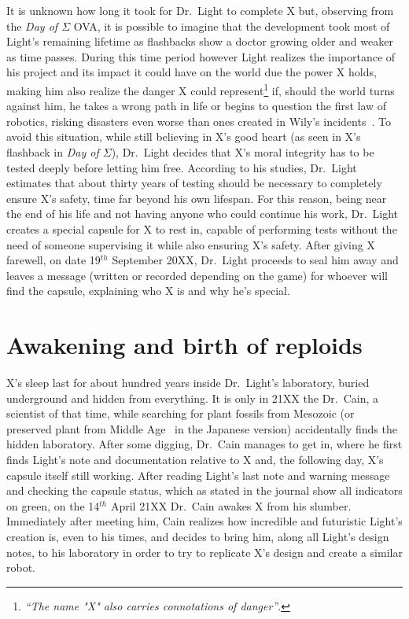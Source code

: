It is unknown how long it took for Dr.~Light to complete X but, observing from the \emph{Day of $\Sigma$} OVA, it is possible to imagine that the development took most of Light's remaining lifetime as flashbacks show a doctor growing older and weaker as time passes.  During this time period however Light realizes the importance of his project and its impact it could have on the world due the power X holds, making him also realize the danger X could represent\footnote{\textit{``The name "X" also carries connotations of danger''}.} if, should the world turns against him, he takes a wrong path in life or begins to question the first law of robotics, risking disasters even worse than ones created in Wily's incidents~\cite{elysium_light_warning}. To avoid this situation, while still believing in X's good heart (as seen in X's flashback in \emph{Day of $\Sigma$}), Dr.~Light decides that X's moral integrity has to be tested deeply before letting him free. According to his studies, Dr.~Light estimates that about thirty years of testing should be necessary to completely ensure X's safety, time far beyond his own lifespan. For this reason, being near the end of his life and not having anyone who could continue his work, Dr.~Light creates a special capsule for X to rest in, capable of performing tests without the need of someone supervising it while also ensuring X's safety. After giving X farewell, on date 19$^{th}$ September 20XX, Dr.~Light proceeds to seal him away and leaves a message (written or recorded depending on the game) for whoever will find the capsule, explaining who X is and why he's special.

\section{Awakening and birth of reploids}
X's sleep last for about hundred years inside Dr.~Light's laboratory, buried underground and hidden from everything. It is only in 21XX the Dr.~Cain, a scientist of that time, while searching for plant fossils  from Mesozoic (or preserved plant from Middle Age~\cite{elysium_Cain_journal} in the Japanese version) accidentally finds the hidden laboratory. After some digging, Dr.~Cain manages to get in, where he first finds Light's note and documentation relative to X and, the following day, X's capsule itself still working. After reading Light's last note and warning message and checking the capsule status, which as stated in the journal show all indicators on green, on the 14$^{th}$ April 21XX Dr.~Cain awakes X from his slumber. Immediately after meeting him, Cain realizes how incredible and futuristic Light's creation is, even to his times, and decides to bring him, along all Light's design notes, to his laboratory in order to try to replicate X's design and create a similar robot.

